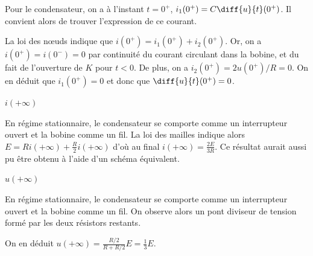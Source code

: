 \begin{corrige}
Pour le condensateur, on a à l'instant $t=0^+$, $i_1(0^+) = C \diff{u}{t}(0^+)$. Il convient alors de trouver l'expression de ce courant.
\par
La loi des nœuds indique que $i(0^+) = i_1(0^+) + i_2(0^+)$. Or, on a $i(0^+) = i(0^-) = 0$ par continuité du courant circulant dans la bobine, et du fait de l'ouverture de $K$ pour $t<0$. De plus, on a $i_2(0^+) = 2u(0^+)/R = 0$. On en déduit que $i_1(0^+)=0$ et donc que $\diff{u}{t}(0^+) = 0$.
\end{corrige}




\begin{enonce}
$i(+\infty)$
\end{enonce}


\begin{corrige}
En régime stationnaire, le condensateur se comporte comme un interrupteur ouvert et la bobine comme un fil. La loi des mailles indique alors $E = Ri(+\infty) + \frac{R}{2}i(+\infty)$ d'où au final $i(+\infty) = \frac{2E}{3R}$. Ce résultat aurait aussi pu être obtenu à l'aide d'un schéma équivalent.
\end{corrige}




\begin{enonce}
$u(+\infty)$
\end{enonce}


\begin{corrigeNewpage}
En régime stationnaire, le condensateur se comporte comme un interrupteur ouvert et la bobine comme un fil. On observe alors un pont diviseur de tension formé par les deux résistors restants. 

On en déduit $u (+\infty)= \frac{R/2}{R+R/2}E = \frac{1}{3}E$.
\end{corrigeNewpage}



\finEntrainement



